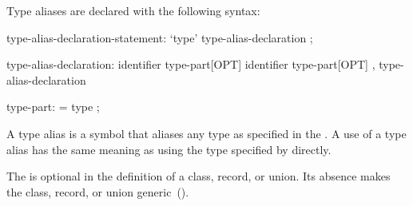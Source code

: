 Type aliases are declared with the following syntax:
\begin{syntax}
type-alias-declaration-statement:
  `type' type-alias-declaration ;

type-alias-declaration:
  identifier type-part[OPT]
  identifier type-part[OPT] , type-alias-declaration

type-part:
  = type ;
\end{syntax}
A type alias is a symbol that aliases any type as specified in the
.  A use of a type alias has the same meaning as using
the type specified by  directly.

The  is optional in the definition of a class, record,
or union.  Its absence makes the class, record, or union
generic~().

